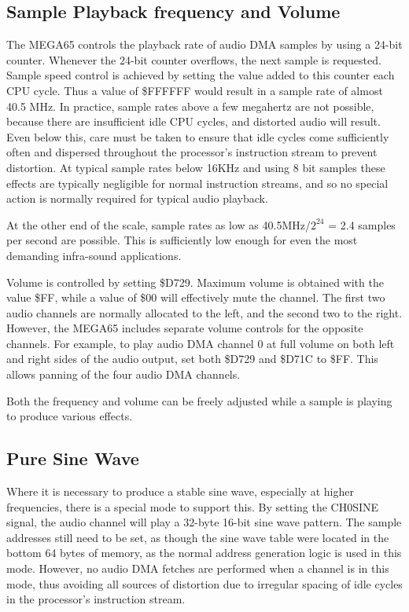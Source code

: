 \subsection{Sample Playback frequency and Volume}

The MEGA65 controls the playback rate of audio DMA samples by using a
24-bit counter.  Whenever the 24-bit counter overflows, the next
sample is requested. Sample speed control is achieved by setting the
value added to this counter each CPU cycle.  Thus a value of
\$FFFFFF would result in a sample rate of almost 40.5 MHz.  In
practice, sample rates above a few megahertz are not possible, because
there are insufficient idle CPU cycles, and distorted audio will
result.  Even below this, care must be taken to ensure that idle
cycles come sufficiently often and dispersed throughout the
processor's instruction stream to prevent distortion.  At typical
sample rates below 16KHz and using 8 bit samples these effects are
typically negligible for normal instruction streams, and so no special
action is normally required for typical audio playback.

At the other end of the scale, sample rates as low as 40.5MHz/$2^{24}$
= 2.4 samples per second are possible.  This is sufficiently low
enough for even the most demanding infra-sound applications.

Volume is controlled by setting \$D729.  Maximum volume is obtained
with the value \$FF, while a value of \$00 will effectively mute the
channel.  The first two audio channels are normally allocated to the
left, and the second two to the right.  However, the MEGA65 includes
separate volume controls for the opposite channels. For example, to
play audio DMA channel 0 at full volume on both left and right sides
of the audio output, set both \$D729 and \$D71C to \$FF.  This allows
panning of the four audio DMA channels.

Both the frequency and volume can be freely adjusted while a sample is playing
to produce various effects.

\subsection{Pure Sine Wave}

Where it is necessary to produce a stable sine wave, especially at
higher frequencies,
there is a special mode to support this. By setting the CH0SINE
signal, the audio channel will play a 32-byte 16-bit sine wave
pattern.  The sample addresses still need to be set, as though the
sine wave table were located in the bottom 64 bytes of memory, as the
normal address generation logic is used in this mode. However, no
audio DMA fetches are performed when a channel is in this mode, thus
avoiding all sources of distortion due to irregular spacing of idle
cycles in the processor's instruction stream.

